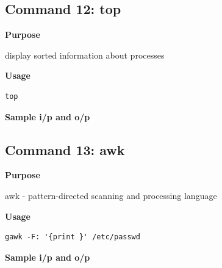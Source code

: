 \documentclass{article}
\begin{document}
\subsection{Command 12: top} 
\textbf{Purpose}
\begin{flushleft}
 display sorted information about processes
\end{flushleft}
\textbf{Usage}
\begin{verbatim}
top
\end{verbatim}
\textbf{Sample i/p and o/p}
\begin{figure}[H] 
\end{figure}
\subsection{Command 13: awk} 
\textbf{Purpose}
\begin{flushleft}
       awk - pattern-directed scanning and processing language
\end{flushleft}
\textbf{Usage}
\begin{verbatim}
gawk -F: '{print }' /etc/passwd
\end{verbatim}
\textbf{Sample i/p and o/p}
\begin{figure}[H] 
\end{figure}
\end{document}
